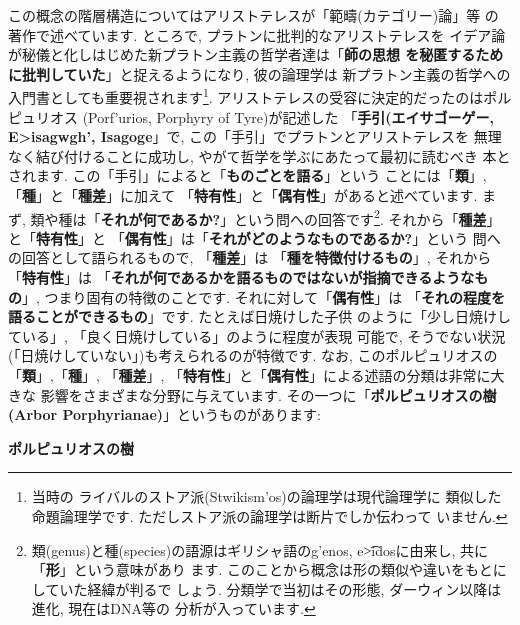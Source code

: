 \documentclass[b5j,8pt,twocolumn]{ltjsarticle}
\newcommand{\textgreek}[1]{\begingroup\fontencoding{LGR}\selectfont#1\endgroup}
\begin{document}
この概念の階層構造についてはアリストテレスが「範疇(カテゴリー)論」等
の著作で述べています. ところで, プラトンに批判的なアリストテレスを
イデア論が秘儀と化しはじめた新プラトン主義の哲学者達は「\textbf{師の思想
を秘匿するために批判していた}」と捉えるようになり, 彼の論理学は
新プラトン主義の哲学への入門書としても重要視されます\footnote{当時の
ライバルのストア派(\textgreek{Stwikism'os})の論理学は現代論理学に
類似した命題論理学です. ただしストア派の論理学は断片でしか伝わって
いません.}. アリストテレスの受容に決定的だったのはポルピュリオス
(\textgreek{Porf'urios}, Porphyry of Tyre)が記述した
「\textbf{手引(エイサゴーゲー, \textgreek{E>isagwgh'},
 Isagoge\cite{Barnes}}」で, この「手引」でプラトンとアリストテレスを
無理なく結び付けることに成功し, やがて哲学を学ぶにあたって最初に読むべき
本とされます. この「手引」によると「\textbf{ものごとを語る}」という
ことには「\textbf{類}」, 「\textbf{種}」と「\textbf{種差}」に加えて
「\textbf{特有性}」と「\textbf{偶有性}」があると述べています. まず,
 類や種は「\textbf{それが何であるか?}」という問への回答です\footnote{
類(genus)と種(species)の語源はギリシャ語の\textgreek{g'enos}, 
 \textgreek{e\t{>i}dos}に由来し, 共に「\textbf{形}」という意味があり
ます. このことから概念は形の類似や違いをもとにしていた経緯が判るで
しょう. 分類学で当初はその形態, ダーウィン以降は進化, 現在はDNA等の
分析が入っています.}. それから「\textbf{種差}」と「\textbf{特有性}」と
「\textbf{偶有性}」は「\textbf{それがどのようなものであるか?}」という
問への回答として語られるもので, 「\textbf{種差}」は
「\textbf{種を特徴付けるもの}」, それから「\textbf{特有性}」は
「\textbf{それが何であるかを語るものではないが指摘できるようなもの}」,
 つまり固有の特徴のことです. それに対して「\textbf{偶有性}」は
「\textbf{それの程度を語ることができるもの}」です. たとえば日焼けした子供
のように「少し日焼けしている」, 「良く日焼けしている」のように程度が表現
可能で, そうでない状況(「日焼けしていない」)も考えられるのが特徴です. なお,
 このポルピュリオスの「\textbf{類}」,「\textbf{種}」, 「\textbf{種差}」,
 「\textbf{特有性}」と「\textbf{偶有性}」による述語の分類は非常に大きな
影響をさまざまな分野に与えています. その一つに「\textbf{ポルピュリオスの樹
(Arbor Porphyrianae)}」というものがあります:


\begin{itembox}[c]{\textbf{ポルピュリオスの樹}}
{\tiny
{}
}
\end{itembox}
\end{document}
